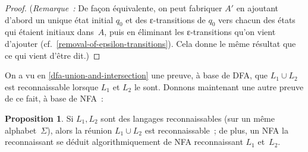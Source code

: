 \documentclass[12pt,a4paper]{article}
\theoremstyle{definition}
\newtheorem{prop}[comcnt]{Proposition}
\begin{document}
\begin{proof}
(\emph{Remarque : } De façon équivalente, on peut fabriquer $A'$ en
ajoutant d'abord un unique état initial $q_0$ et des ε-transitions de
$q_0$ vers chacun des états qui étaient initiaux dans $A$, puis en
éliminant les ε-transitions qu'on vient d'ajouter
(cf. \ref{removal-of-epsilon-transitions}).  Cela donne le même
résultat que ce qui vient d'être dit.)
\end{proof}

\bigbreak

On a vu en \ref{dfa-union-and-intersection} une preuve, à base de DFA,
que $L_1 \cup L_2$ est reconnaissable lorsque $L_1$ et $L_2$ le sont.
Donnons maintenant une autre preuve de ce fait, à base de NFA :

\begin{prop}\label{nfa-union}
Si $L_1,L_2$ sont des langages reconnaissables (sur un même
alphabet $\Sigma$), alors la réunion $L_1
\cup L_2$ est reconnaissable ; de plus, un NFA la reconnaissant se
déduit algorithmiquement de NFA reconnaissant $L_1$ et $L_2$.
\end{prop}
\end{document}
